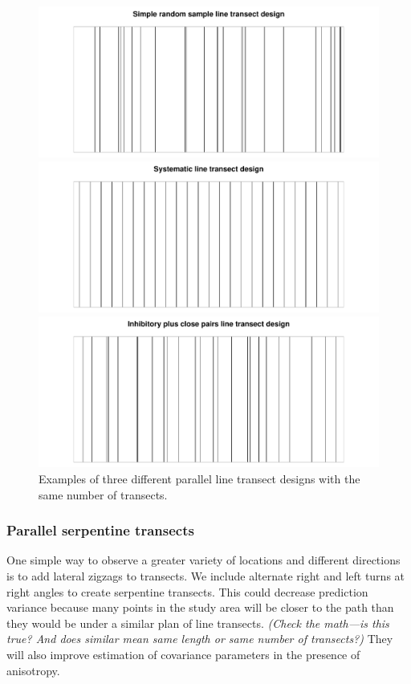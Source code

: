 \documentclass[review]{elsarticle}
\begin{document}
\begin{figure}
\includegraphics[width=5in]{SRS000176.pdf}

\includegraphics[width=5in]{Sys000141.pdf}

\includegraphics[width=5in]{Inhib000171.pdf}

\caption{Examples of three different parallel line transect designs with the
same number of transects.}
\label{linexsects}
\end{figure}

\subsubsection{Parallel serpentine transects}

One simple way to observe a greater variety of locations and different
directions is to add lateral zigzags to transects. We include alternate right
and left turns at right angles to create serpentine transects. This could
decrease prediction variance because many points in the study area will be
closer to the path than they would be under a similar plan of line transects.
{\it (Check the math---is this true? And does similar mean same length or same
number of transects?)} They will also improve estimation of covariance
parameters in the presence of anisotropy.
\end{document}
